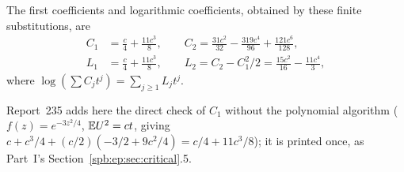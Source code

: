The first coefficients and logarithmic coefficients, obtained by these finite substitutions, are
\begin{align}
 C_1&=\frac c4+\frac{11c^3}{8},\qquad
 C_2=\frac{31c^2}{32}-\frac{319c^4}{96}+\frac{121c^6}{128},\label{spb:ml:eq:C12}\\
 L_1&=\frac c4+\frac{11c^3}{8},\qquad
 L_2=C_2-C_1^2/2=\frac{15c^2}{16}-\frac{11c^4}{3},\label{spb:ml:eq:L12}
\end{align}
where $\log(\sum C_jt^j)=\sum_{j\ge1}L_jt^j$. 
\begin{writenote}
Report~235 adds here the direct check of $C_1$ without the polynomial
algorithm ($f(z)=e^{-3z^2/4}$, $\mathbb E U^2=ct$, giving $c+c^3/4+(c/2)(-3/2+9c^2/4)=c/4+11c^3/8$);
it is printed once, as Part~I's Section~\ref{spb:ep:sec:critical}.5.
\end{writenote}

